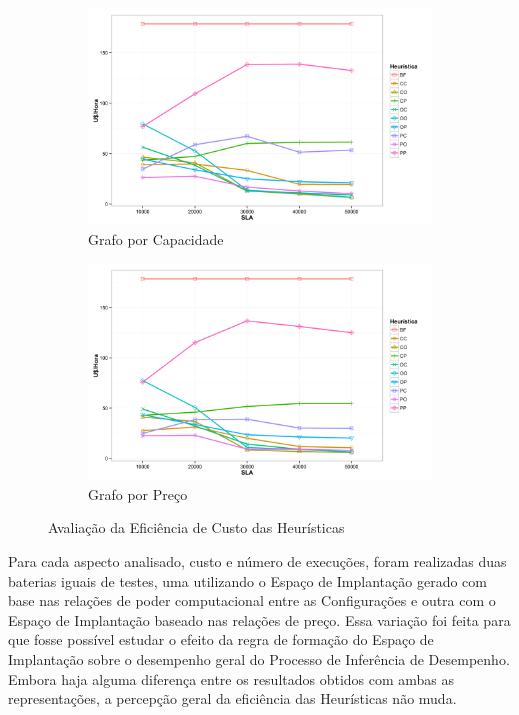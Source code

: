 \begin{figure}[hbt]
  \centering
    \begin{subfigure}[a]{0.7\textwidth}
      \includegraphics[width=\textwidth]{img/ExecutionCost-Capacity}
      \caption{Grafo por Capacidade}
      \label{fig:eficiencia_custo_capacidade}
    \end{subfigure}
    \begin{subfigure}[b]{0.7\textwidth}
      \includegraphics[width=\textwidth]{img/ExecutionCost-Price}
      \caption{Grafo por Preço}
      \label{fig:eficiencia_custo_preco}
    \end{subfigure}
  \caption{\label{fig:eficiencia_custo}Avaliação da Eficiência de Custo das Heurísticas}
\end{figure}

Para cada aspecto analisado, custo e número de execuções, foram realizadas duas 
baterias iguais de testes, uma utilizando o Espaço de Implantação gerado com base 
nas relações de poder computacional entre as Configurações e outra com o Espaço de 
Implantação baseado nas relações de preço. Essa variação foi feita para que fosse
possível estudar o efeito da regra de formação do Espaço de Implantação sobre o
desempenho geral do Processo de Inferência de Desempenho. Embora haja alguma 
diferença entre os resultados obtidos com ambas as representações, a percepção 
geral da eficiência das Heurísticas não muda.   


